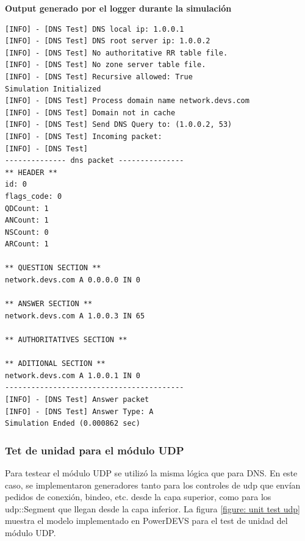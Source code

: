 \documentclass[10pt,a4paper]{article}
\begin{document}
\newpage

\textbf{Output generado por el logger durante la simulación}
\begin{lstlisting}
[INFO] - [DNS Test] DNS local ip: 1.0.0.1
[INFO] - [DNS Test] DNS root server ip: 1.0.0.2
[INFO] - [DNS Test] No authoritative RR table file.
[INFO] - [DNS Test] No zone server table file.
[INFO] - [DNS Test] Recursive allowed: True
Simulation Initialized
[INFO] - [DNS Test] Process domain name network.devs.com
[INFO] - [DNS Test] Domain not in cache
[INFO] - [DNS Test] Send DNS Query to: (1.0.0.2, 53)
[INFO] - [DNS Test] Incoming packet:
[INFO] - [DNS Test] 
-------------- dns packet ---------------
** HEADER ** 
id: 0
flags_code: 0
QDCount: 1
ANCount: 1
NSCount: 0
ARCount: 1

** QUESTION SECTION ** 
network.devs.com A 0.0.0.0 IN 0 

** ANSWER SECTION ** 
network.devs.com A 1.0.0.3 IN 65 

** AUTHORITATIVES SECTION ** 

** ADITIONAL SECTION ** 
network.devs.com A 1.0.0.1 IN 0 
-----------------------------------------
[INFO] - [DNS Test] Answer packet
[INFO] - [DNS Test] Answer Type: A
Simulation Ended (0.000862 sec)
\end{lstlisting}

\subsubsection{Tet de unidad para el módulo UDP}

Para testear el módulo UDP se utilizó la misma lógica que para DNS. En este caso, se implementaron generadores tanto para los controles de udp que envían pedidos de conexión, bindeo, etc. desde la capa superior, como para los udp::Segment que llegan desde la capa inferior. La figura \ref{figure: unit test udp} muestra el modelo implementado en PowerDEVS para el test de unidad del módulo UDP. \\
\end{document}
